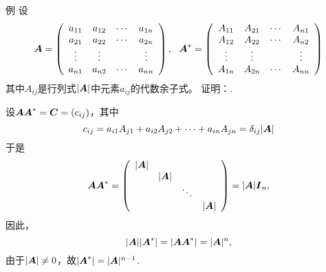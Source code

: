 \begin{frame}
  \begin{footnotesize}
    \begin{block}{例}
      设
      $$
      \boldsymbol{A} = \left(
        \begin{array}{cccc}
          a_{11} & a_{12} & \cdots & a_{1n} \\
          a_{21} & a_{22} & \cdots & a_{2n} \\
          \vdots   & \vdots   &     & \vdots   \\
          a_{n1} & a_{n2} & \cdots & a_{nn} \\
        \end{array}
      \right), ~~
      \boldsymbol{A}^* = \left(
        \begin{array}{cccc}
          A_{11} & A_{21} & \cdots & A_{n1} \\
          A_{12} & A_{22} & \cdots & A_{n2} \\
          \vdots   & \vdots   &     & \vdots   \\
          A_{1n} & A_{2n} & \cdots & A_{nn} \\
        \end{array}
      \right)
      $$
      其中$A_{ij}$是行列式$|\boldsymbol{A}|$中元素$a_{ij}$的代数余子式。
      证明：.      
    \end{block}
    \pause 
    \proofname
    设$\boldsymbol{A}\boldsymbol{A}^*=\boldsymbol{C}=(c_{ij})$，其中
    $$
    c_{ij} = a_{i1}A_{j1} + a_{i2}A_{j2} + \cdots + a_{in}A_{jn} = \delta_{ij}|\boldsymbol{A}|
    $$
    \pause
    于是
    $$
    \boldsymbol{A}\boldsymbol{A}^* = \left(
      \begin{array}{cccc}
        |\boldsymbol{A}|&&&\\
            &|\boldsymbol{A}|&&\\
            &&\ddots&\\
            &&&|\boldsymbol{A}|
      \end{array}
    \right) = |\boldsymbol{A}| \boldsymbol{I}_n,
    $$\pause 
    因此，
    $$
    |\boldsymbol{A}||\boldsymbol{A}^*| = |\boldsymbol{A}\boldsymbol{A}^*| = |\boldsymbol{A}|^n,
    $$\pause 
    由于$|\boldsymbol{A}|\ne 0$，故$|\boldsymbol{A}^*|=|\boldsymbol{A}|^{n-1}$.
  \end{footnotesize}
\end{frame}


